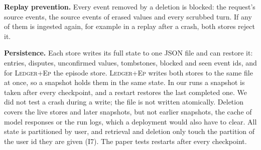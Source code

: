 \documentclass[10pt,conference]{IEEEtran}
\newcommand{\hyb}{\textsc{Ledger+Ep}}
\begin{document}
\textbf{Replay prevention.} Every event removed by a deletion is blocked: the request's source events, the source events of erased values and every scrubbed turn. If any of them is ingested again, for example in a replay after a crash, both stores reject it.

\textbf{Persistence.} Each store writes its full state to one JSON file and can restore it: entries, disputes, unconfirmed values, tombstones, blocked and seen event ids, and for \hyb{} the episode store. \hyb{} writes both stores to the same file at once, so a snapshot holds them in the same state. In our runs a snapshot is taken after every checkpoint, and a restart restores the last completed one. We did not test a crash during a write; the file is not written atomically. Deletion covers the live stores and later snapshots, but not earlier snapshots, the cache of model responses or the run logs, which a deployment would also have to clear. All state is partitioned by user, and retrieval and deletion only touch the partition of the user id they are given (I7). The paper tests restarts after every checkpoint.
\end{document}
